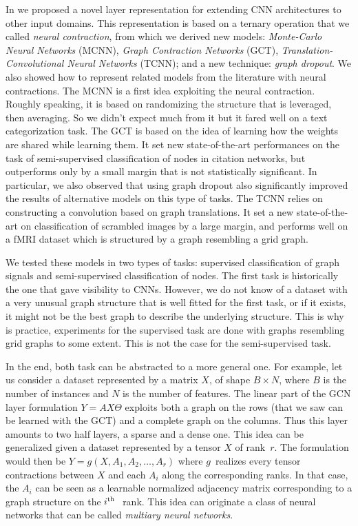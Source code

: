 In  we proposed a novel layer representation for extending CNN architectures to other input domains. This representation is based on a ternary operation that we called \emph{neural contraction}, from which we derived new models: \emph{Monte-Carlo Neural Networks} (MCNN), \emph{Graph Contraction Networks} (GCT), \emph{Translation-Convolutional Neural Networks} (TCNN); and a new technique: \emph{graph dropout}. We also showed how to represent related models from the literature with neural contractions. The MCNN is a first idea exploiting the neural contraction. Roughly speaking, it is based on randomizing the structure that is leveraged, then averaging. So we didn't expect much from it but it fared well on a text categorization task. The GCT is based on the idea of learning how the weights are shared while learning them. It set new state-of-the-art performances on the task of semi-supervised classification of nodes in citation networks, but outperforms only by a small margin that is not statistically significant. In particular, we also observed that using graph dropout also significantly improved the results of alternative models on this type of tasks. The TCNN relies on constructing a convolution based on graph translations. It set a new state-of-the-art on classification of scrambled images by a large margin, and performs well on a fMRI dataset which is structured by a graph resembling a grid graph.

\vspace{0.2cm}

We tested these models in two types of tasks: supervised classification of graph signals and semi-supervised classification of nodes. The first task is historically the one that gave visibility to CNNs. However, we do not know of a dataset with a very unusual graph structure that is well fitted for the first task, or if it exists, it might not be the best graph to describe the underlying structure. This is why is practice, experiments for the supervised task are done with graphs resembling grid graphs to some extent. This is not the case for the semi-supervised task.

\vspace{0.2cm}

In the end, both task can be abstracted to a more general one. For example, let us consider a dataset represented by a matrix $X$, of shape $B \times N$, where $B$ is the number of instances and $N$ is the number of features. The linear part of the GCN layer formulation $Y = A X \Theta$ exploits both a graph on the rows (that we saw can be learned with the GCT) and a complete graph on the columns. Thus this layer amounts to two half layers, a sparse and a dense one. This idea can be generalized given a dataset represented by a tensor $X$ of rank~$r$. The formulation would then be $Y = g(X, A_1, A_2, \ldots, A_r)$ where $g$~realizes every tensor contractions between $X$ and each $A_i$ along the corresponding ranks. In that case, the $A_i$ can be seen as a learnable normalized adjacency matrix corresponding to a graph structure on the $i\text{$^\text{th}$~}$ rank. This idea can originate a class of neural networks that can be called \emph{multiary neural networks}.

